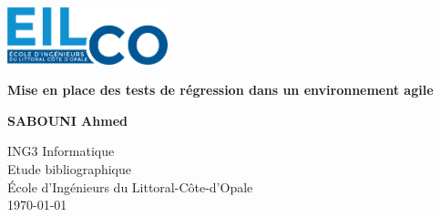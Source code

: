 \begin{titlepage}
    \begin{center}
      \includegraphics[width=0.35\textwidth]{logo.png}
        \vspace*{1.5cm}
        
        \Huge
        \textbf{Mise en place des tests de régression \linebreak dans un environnement agile}
        
        \vspace{0.5cm}
        \LARGE
        
        \vspace{1.5cm}
        
        \textbf{SABOUNI Ahmed}
   		  \vspace{1.5cm}
        
       
        \vfill
        
        ING3 Informatique\\
        
        \vspace{0.8cm}
          \Large
          Etude bibliographique\\
          École d'Ingénieurs du Littoral-Côte-d'Opale\\
      \today
        
    \end{center}
\end{titlepage}